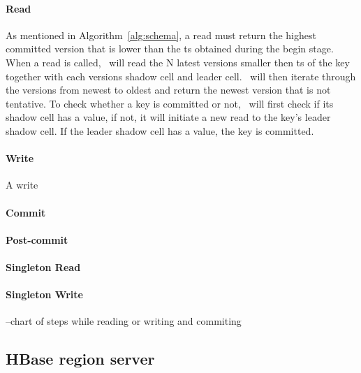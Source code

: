 \paragraph{Read}
As mentioned in Algorithm~\ref{alg:schema}, a read must return the highest committed version that is lower than the ts obtained during the begin stage. When a read is called, \sys\ will read the N latest versions smaller then ts of the key together with each versions shadow cell and leader cell. \sys\ will then iterate through the versions from newest to oldest and return the newest version that is not tentative. To check whether a key is committed or not, \sys\ will first check if its shadow cell has a value, if not, it will initiate a new read to the key's leader shadow cell. If the leader shadow cell has a value, the key is committed. 

\paragraph{Write}
A write 


\paragraph{Commit}

\paragraph{Post-commit}

\paragraph{Singleton Read}

\paragraph{Singleton Write}

--chart of steps while reading or writing and commiting

\subsection{HBase region server}
\label{ssec:hbase}
